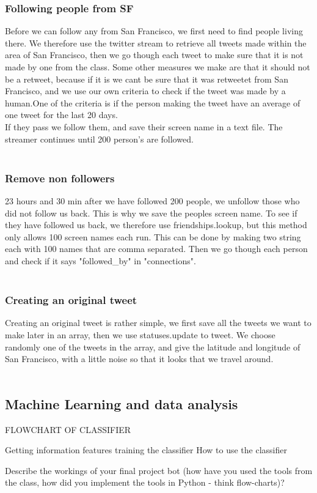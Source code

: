 \subsubsection{Following people from SF}
Before we can follow any from San Francisco, we first need to find people living there. We therefore use the twitter stream to retrieve all tweets made within the area of San Francisco, then we go though each tweet to make sure that it is not made by one from the class. Some other measures we make are that it should not be a retweet, because if it is we cant be sure that it was retweetet from San Francisco, and we use our own criteria to check if the tweet was made by a human.One of the criteria is if the person making the tweet have an average of one tweet for the last 20 days.\\ 
If they pass we follow them, and save their screen name in a text file. The streamer continues until 200 person's are followed.\\
\\

\subsubsection{Remove non followers}
23 hours and 30 min after we have followed 200 people, we unfollow those who did not follow us back. This is why we save the peoples screen name. To see if they have followed us back, we therefore use friendships.lookup, but this method only allows 100 screen names each run. This can be done by making two string each with 100 names that are comma separated. Then we go though each person and check if it says "followed\_by" in "connections".\\
\\

\subsubsection{Creating an original tweet}
Creating an original tweet is rather simple, we first save all the tweets we want to make later in an array, then we use statuses.update to tweet. We choose randomly one of the tweets in the array, and give the latitude and longitude of San Francisco, with a little noise so that it looks that we travel around.\\
\\

\subsection{Machine Learning and data analysis}
FLOWCHART OF CLASSIFIER

Getting information
features
training the classifier
How to use the classifier


Describe the workings of your final project bot (how have you used the tools from the class, how did you implement the tools in Python - think flow-charts)?\\